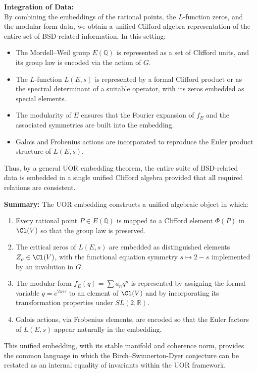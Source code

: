 \documentclass[11pt]{article}
\begin{document}
\bigskip

\textbf{Integration of Data:} \\
By combining the embeddings of the rational points, the \(L\)-function zeros, and the modular form data, we obtain a unified Clifford algebra representation of the entire set of BSD-related information. In this setting:
\begin{itemize}[leftmargin=2em]
  \item The Mordell--Weil group \(E(\mathbb{Q})\) is represented as a set of Clifford units, and its group law is encoded via the action of \(G\).
  \item The \(L\)-function \(L(E,s)\) is represented by a formal Clifford product or as the spectral determinant of a suitable operator, with its zeros embedded as special elements.
  \item The modularity of \(E\) ensures that the Fourier expansion of \(f_E\) and the associated symmetries are built into the embedding.
  \item Galois and Frobenius actions are incorporated to reproduce the Euler product structure of \(L(E,s)\).
\end{itemize}

Thus, by a general UOR embedding theorem, the entire suite of BSD-related data is embedded in a single unified Clifford algebra provided that all required relations are consistent.

\bigskip

\noindent \textbf{Summary:} The UOR embedding constructs a unified algebraic object in which:
\begin{enumerate}[label=(\alph*)]
  \item Every rational point \(P\in E(\mathbb{Q})\) is mapped to a Clifford element \(\Phi(P)\) in \(\Cl(V)\) so that the group law is preserved.
  \item The critical zeros of \(L(E,s)\) are embedded as distinguished elements \(Z_\rho\in \Cl(V)\), with the functional equation symmetry \(s\mapsto 2-s\) implemented by an involution in \(G\).
  \item The modular form \(f_E(q)=\sum a_n q^n\) is represented by assigning the formal variable \(q=e^{2\pi i\tau}\) to an element of \(\Cl(V)\) and by incorporating its transformation properties under \(SL(2,\mathbb{R})\).
  \item Galois actions, via Frobenius elements, are encoded so that the Euler factors of \(L(E,s)\) appear naturally in the embedding.
\end{enumerate}
This unified embedding, with its stable manifold and coherence norm, provides the common language in which the Birch--Swinnerton-Dyer conjecture can be restated as an internal equality of invariants within the UOR framework.
\end{document}
